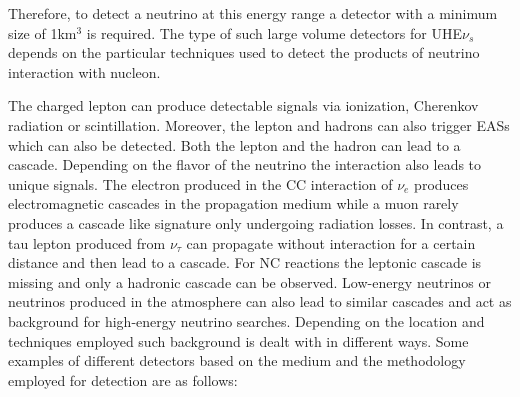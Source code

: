 Therefore, to detect a neutrino at this energy range a detector with a minimum size of 1km$^3$ is required. The type of such large volume detectors for UHE$\nu_s$ depends on the particular techniques used to detect the products of neutrino interaction with nucleon. 


The charged lepton can produce detectable signals via ionization, Cherenkov radiation or scintillation. Moreover, the lepton and hadrons can also trigger EASs which can also be detected. Both the lepton and the hadron can lead to a cascade. Depending on the flavor of the neutrino the interaction also leads to unique signals. The electron produced in the CC interaction of $\nu_e$ produces electromagnetic cascades in the propagation medium while a muon rarely produces a cascade like signature only undergoing radiation losses. In contrast, a tau lepton produced from $\nu_{\tau}$ can propagate without interaction for a certain distance and then lead to a cascade. For NC reactions the leptonic cascade is missing and only a hadronic cascade can be observed. Low-energy neutrinos or neutrinos produced in the atmosphere can also lead to similar cascades and act as background for high-energy neutrino searches. Depending on the location and techniques employed such background is dealt with in different ways. Some examples of different detectors based on the medium and the methodology employed for detection are as follows:

